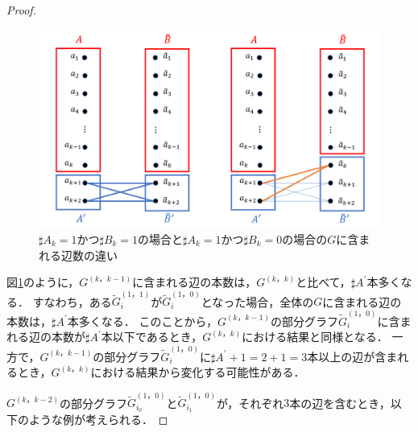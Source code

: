 \begin{proof}
\begin{figure}
\centering
\includegraphics[width=\linewidth]{画像/abが異なる場合.png}
\vspace{-1cm}
\caption{$\sharp A_{k} =1$かつ$\sharp B_{k}=1$の場合と$\sharp A_{k}=1$かつ$\sharp B_{k}=0$の場合の$G$に含まれる辺数の違い}
\label{abが異なる場合}
\end{figure}

図\ref{abが異なる場合}のように，$G^{(k，k-1)}$に含まれる辺の本数は，$G^{(k，k)}$と比べて，$\sharp A^{\prime}$本多くなる．
すなわち，ある$\tilde{G}^{(1，1)}_{i}$が$\tilde{G}^{(1，0)}_{i}$となった場合，全体の$G$に含まれる辺の本数は，$\sharp A^{\prime}$本多くなる．
このことから，$G^{(k，k-1)}$の部分グラフ$\tilde{G}^{(1，0)}_{i}$に含まれる辺の本数が$\sharp A^{\prime}$本以下であるとき，$G^{(k，k)}$における結果と同様となる．
一方で，$G^{(k，k-1)}$の部分グラフ$\tilde{G}^{(1，0)}_{i}$に$\sharp A^{\prime}+1=2+1=3$本以上の辺が含まれるとき，$G^{(k，k)}$における結果から変化する可能性がある．

$G^{(k，k-2)}$の部分グラフ$\tilde{G}^{(1，0)}_{i_{0}}$と$\tilde{G}^{(1，0)}_{i_{1}}$が，それぞれ$3$本の辺を含むとき，以下のような例が考えられる．


\end{proof}
